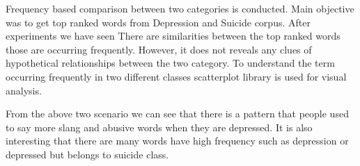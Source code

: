 \documentclass[12pt, letterpaper]{article}
\begin{document}
Frequency based comparison between two categories is conducted. Main objective was to get top ranked words from Depression and Suicide corpus. After experiments we have seen There are similarities between the top ranked words those are occurring frequently. However, it does not reveals any clues of hypothetical relationships between the two category. To understand the term occurring frequently in two different classes scatterplot library is used for visual analysis.  



From the above two scenario we can see that there is a pattern that people used to say more slang and abusive words when they are depressed. It is also interesting that there are many words have high frequency such as depression or depressed but belongs to suicide class. 
\end{document}
